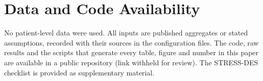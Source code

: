 \section*{Data and Code Availability}
\label{sec:availability}

No patient-level data were used. All inputs are published aggregates or stated assumptions, recorded with their sources in the configuration files. The code, raw results and the scripts that generate every table, figure and number in this paper are available in a public repository (link withheld for review). The STRESS-DES checklist is provided as supplementary material.
